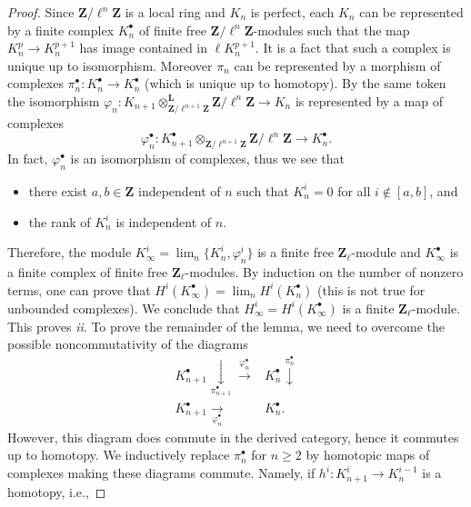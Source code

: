 \begin{proof}

Since $\mathbf{Z}/\ell^n\mathbf{Z}$ is a local ring and $K_n$ is perfect, each
$K_n$ can be represented by a finite complex $K_n^\bullet$ of finite free
$\mathbf{Z}/\ell^n \mathbf{Z}$-modules such that the map $K_n^p \to K_n^{p+1}$
has image contained in $\ell K_n^{p+1}$. It is a fact that such a complex is
unique up to isomorphism. Moreover $\pi_n$ can be represented by a morphism of
complexes $\pi_n^\bullet : K_n^\bullet\to K_n^\bullet$ (which is unique up to
homotopy). By the same token the isomorphism
$\varphi_n : K_{n+1} \otimes_{\mathbf{Z}/\ell^{n+1}\mathbf{Z}}^{\mathbf{L}}
\mathbf{Z}/\ell^n\mathbf{Z}\to K_n$ is represented by a map of complexes
$$
\varphi_n^\bullet :
K_{n+1}^\bullet
\otimes_{\mathbf{Z}/\ell^{n+1}\mathbf{Z}}
\mathbf{Z}/\ell^n\mathbf{Z} \to K_n^\bullet.
$$
In fact, $\varphi_n^\bullet$ is an isomorphism of complexes, thus we see that
\begin{itemize}
\item
there exist $a, b\in \mathbf{Z}$ independent of $n$ such that $K_n^i = 0$ for
all $i\notin[a, b]$, and
\item
the rank of $K_n^i$ is independent of $n$.
\end{itemize}
Therefore, the module $K_\infty^i = \lim_n \{K_n^i, \varphi_n^i\}$ is a
finite free $\mathbf{Z}_\ell$-module and $K_\infty^\bullet$ is a finite complex
of finite free $\mathbf{Z}_\ell$-modules. By induction on the number of nonzero
terms, one can prove that $H^i\left(K_\infty^\bullet\right) = \lim_n
H^i\left(K_n^\bullet\right)$ (this is not true for unbounded complexes). We
conclude that $H_\infty^i = H^i\left(K_\infty^\bullet\right)$ is a finite
$\mathbf{Z}_\ell$-module. This proves {\it ii}. To prove the remainder of the
lemma, we need to overcome the possible noncommutativity of the diagrams
$$
\begin{array}{cc}{K_{n+1}^\bullet} \underset{\pi_{n+1}^\bullet}{\downarrow}\overset{\varphi_n^\bullet}{\longrightarrow} & {K_n^\bullet} \overset{\pi_n^\bullet}{\downarrow} \\ {K_{n+1}^\bullet} \underset{\varphi_n^\bullet}{\longrightarrow} & {K_n^\bullet.}\end{array}
$$
However, this diagram does commute in the derived category, hence it commutes
up to homotopy. We inductively replace $\pi_n^\bullet$ for $n\geq 2$ by
homotopic maps of complexes making these diagrams commute. Namely, if $h^i :
K_{n+1}^i \to K_n^{i-1}$ is a homotopy, i.e.,

\end{proof}
